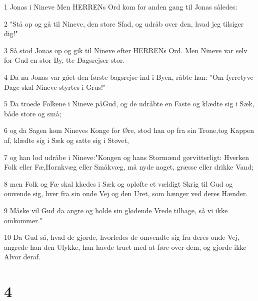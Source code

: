 \par 1 Jonas i Nineve Men HERRENs Ord kom for anden gang til Jonas således:
\par 2 "Stå op og gå til Nineve, den store Sfad, og udråb over den, hvad jeg tilsiger dig!"
\par 3 Så stod Jonas op og gik til Nineve efter HERRENs Ord. Men Nineve var selv for Gud en stor By, tte Dagsrejser stor.
\par 4 Da nu Jonas var gået den første bagsrejse ind i Byen, råbte han: "Om fyrretyve Dage skal Nineve styrtes i Grus!"
\par 5 Da troede Folkene i Nineve påGud, og de udråbte en Faste og klædte sig i Sæk, både store og små;
\par 6 og da Sagen kom Nineves Konge for Øre, stod han op fra sin Trone,tog Kappen af, klædte sig i Sæk og satte sig i Støvet,
\par 7 og han lod udråbe i Nineve:"Kongen og hans Stormænd gørvitterligt: Hverken Folk eller Fæ,Hornkvæg eller Småkvæg, må nyde noget, græsse eller drikke Vand;
\par 8 men Folk og Fæ skal klædes i Sæk og opløfte et vældigt Skrig til Gud og omvende sig, hver fra sin onde Vej og den Uret, som hænger ved deres Hænder.
\par 9 Måske vil Gud da angre og holde sin glødende Vrede tilbage, så vi ikke omkommer."
\par 10 Da Gud så, hvad de gjorde, hvorledes de omvendte sig fra deres onde Vej, angrede han den Ulykke, han havde truet med at føre over dem, og gjorde ikke Alvor deraf.

\chapter{4}

